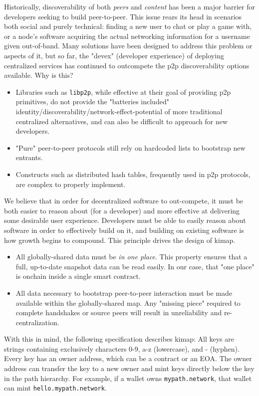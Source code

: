 \documentclass[runningheads]{llncs}
\begin{document}
Historically, discoverability of both \textit{peers} and \textit{content} has been a major barrier for developers seeking to build peer-to-peer.
This issue rears its head in scenarios both social and purely technical: finding a new user to chat or play a game with, or a node's software acquiring the actual networking information for a username given out-of-band.
Many solutions have been designed to address this problem or aspects of it, but so far, the "devex" (developer experience) of deploying centralized services has continued to outcompete the p2p discoverability options available.
Why is this?
\begin{itemize}
    \item Libraries such as \verb|libp2p|, while effective at their goal of providing p2p primitives, do not provide the "batteries included" identity/discoverability/network-effect-potential of more traditional centralized alternatives, and can also be difficult to approach for new developers.
    \item "Pure" peer-to-peer protocols still rely on hardcoded lists to bootstrap new entrants.
    \item Constructs such as distributed hash tables, frequently used in p2p protocols, are complex to properly implement.
\end{itemize}
We believe that in order for decentralized software to out-compete, it must be both easier to reason about (for a developer) and more effective at delivering some desirable user experience.
Developers must be able to easily reason about software in order to effectively build on it, and building on existing software is how growth begins to compound.
This principle drives the design of kimap.
\begin{itemize}
    \item All globally-shared data must be \textit{in one place}.
    This property ensures that a full, up-to-date snapshot data can be read easily.
    In our case, that "one place" is onchain inside a single smart contract.
    \item All data necessary to bootstrap peer-to-peer interaction must be made available within the globally-shared map.
    Any "missing piece" required to complete handshakes or source peers will result in unreliability and re-centralization.
\end{itemize}

With this in mind, the following specification describes kimap:
All keys are strings containing exclusively characters 0-9, a-z (lowercase), and - (hyphen).
Every key has an owner address, which can be a contract or an EOA. The owner address can transfer the key to a new owner and mint keys directly below the key in the path hierarchy. For example, if a wallet owns \verb|mypath.network|, that wallet can mint \verb|hello.mypath.network|.
\end{document}

